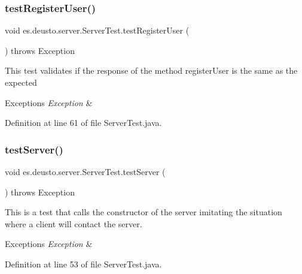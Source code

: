 \subsubsection{\texorpdfstring{test\+Register\+User()}{testRegisterUser()}}
{\footnotesize\ttfamily void es.\+deusto.\+server.\+Server\+Test.\+test\+Register\+User (\begin{DoxyParamCaption}{ }\end{DoxyParamCaption}) throws Exception}

This test validates if the response of the method register\+User is the same as the expected 
\begin{DoxyExceptions}{Exceptions}
{\em Exception} & \\
\hline
\end{DoxyExceptions}


Definition at line 61 of file Server\+Test.\+java.

\mbox{\label{classes_1_1deusto_1_1server_1_1_server_test_a9c697e77e1422a1d0835f6e6a38036f4}} 
\subsubsection{\texorpdfstring{test\+Server()}{testServer()}}
{\footnotesize\ttfamily void es.\+deusto.\+server.\+Server\+Test.\+test\+Server (\begin{DoxyParamCaption}{ }\end{DoxyParamCaption}) throws Exception}

This is a test that calls the constructor of the server imitating the situation where a client will contact the server. 
\begin{DoxyExceptions}{Exceptions}
{\em Exception} & \\
\hline
\end{DoxyExceptions}


Definition at line 53 of file Server\+Test.\+java.

\mbox{\label{classes_1_1deusto_1_1server_1_1_server_test_ade86728a524037a1712106cd4741c690}} 
